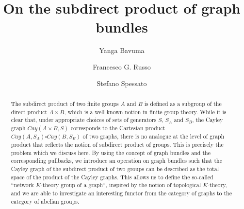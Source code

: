 \documentclass{amsart}
\theoremstyle{definition}
\numberwithin{equation}{section}
\begin{document}
\title[On the subdirect product of graph bundles]{On the subdirect product of  graph bundles}

\author[Y. Bavuma]{Yanga Bavuma}
\address{Yanga Bavuma\endgraf
Department of Mathematics and Applied Mathematics\endgraf
University of Cape Town\endgraf
Private Bag X1, Rondebosch, 7701\endgraf
Cape Town, South Africa\endgraf}

\author[F.G. Russo]{Francesco G. Russo}
\address{Francesco G. Russo\endgraf
School of Science and Technology\endgraf
Universit\'a degli Studi di Camerino\endgraf
via Madonna delle Carceri 9, 62032\endgraf 
Camerino, Italy\endgraf
and\endgraf
Department of Mathematics and Applied Mathematics\endgraf
University of the Western Cape\endgraf
Private Bag X17, 7535,  Bellville, South Africa\endgraf}


\author[S. Spessato]{Stefano Spessato}
\address{Stefano Spessato\endgraf
Dipartimento di Ingegneria\endgraf
Universit\`{a} degli Studi Niccol\`{o} Cusano \endgraf
Via Don Carlo Gnocchi 3, 00166 \endgraf
Rome, Italy\endgraf}





\begin{abstract}
The subdirect product of two finite groups $A$ and $B$ is defined as a subgroup of the direct product $A \times B$, which is a well-known notion in finite group theory. While it is clear that, under appropriate choices of sets of generators $S$, $S_A$ and $S_B$, the Cayley graph $Cay(A \times B, S)$ corresponds to the Cartesian product $Cay(A, S_A) \square Cay(B, S_B)$ of two graphs, there is no analogue at the level of graph product that reflects the notion of subdirect product of groups. This is precisely the problem which we  discuss here. By using the concept of graph bundles and the corresponding pullbacks, we introduce an operation on graph bundles such that the Cayley graph of the subdirect product of two groups can be described as the total space of the product of the Cayley graphs. This allows us to define the so-called ``network $K$-theory group of a graph'', inspired by the notion of topological $K$-theory, and we are able to  investigate an interesting  functor from the category of graphs to the category of abelian groups.
\end{abstract}
\end{document}
